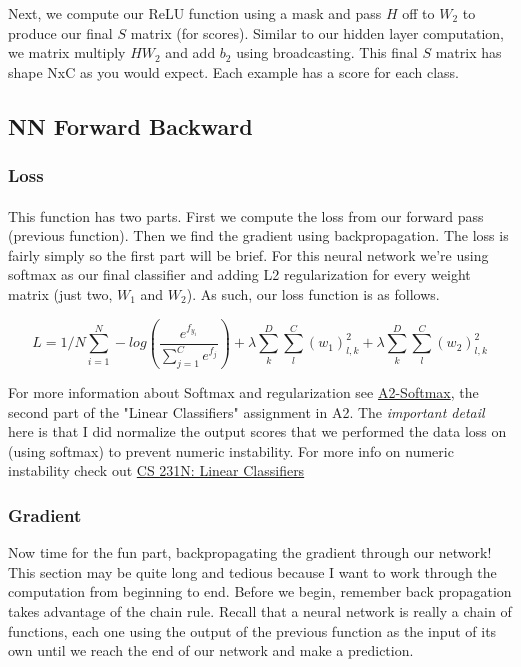 \documentclass[12pt]{article}
\begin{document}
Next, we compute our ReLU function using a mask and pass $H$ off to $W_2$ to produce 
our final $S$ matrix (for scores). Similar to our hidden layer computation, we matrix multiply
$HW_2$ and add $b_2$ using broadcasting. This final $S$ matrix has shape NxC as you would 
expect. Each example has a score for each class. 

\subsection{NN Forward Backward}
\subsubsection*{Loss}
\paragraph{}
This function has two parts. First we compute the loss from our forward pass (previous function). 
Then we find the gradient using backpropagation. The loss is fairly simply so the first
part will be brief. For this neural network we're using softmax as our final classifier and adding 
L2 regularization for every weight matrix (just two, $W_1$ and $W_2$). As such, our loss 
function is as follows. 

\begin{equation}
    L = 1/N \sum_{i=1}^N - log(\frac{e^{f_{y_i}}}{\sum_{j=1}^C e^{f_j}}) + 
    \lambda \sum_{k}^D \sum_{l}^C (w_1)_{l, k}^2 + 
    \lambda \sum_{k}^D \sum_{l}^C (w_2)_{l, k}^2
\end{equation}

\noindent For more information about Softmax and regularization see 
\href{https://github.com/bensmidt/EECS-498-DL-Computer-Vision/blob/main/A2/A2-Softmax.pdf}
{A2-Softmax}, the second part of the "Linear Classifiers" assignment in A2. The \emph{
important detail} here is that I did normalize the output scores that we performed the 
data loss on (using softmax) to prevent numeric instability. For more info on numeric instability
check out \href{https://cs231n.github.io/linear-classify/}{CS 231N: Linear Classifiers}

\subsubsection*{Gradient}

Now time for the fun part, backpropagating the gradient through our network! This section may 
be quite long and tedious because I want to work through the computation from beginning to end.
Before we begin, remember back propagation takes advantage of the chain rule. Recall that a neural 
network is really a chain of functions, each one using the output of the previous function as 
the input of its own until we reach the end of our network and make a prediction. 
\end{document}
